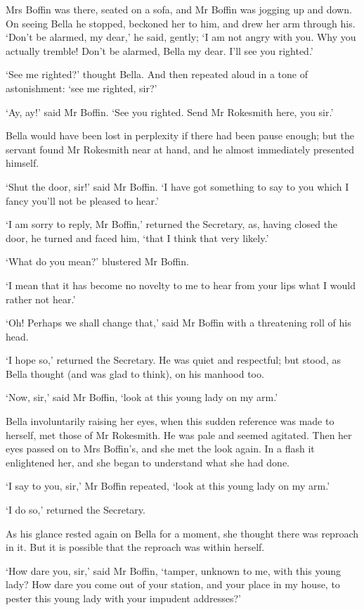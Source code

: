 Mrs Boffin was there, seated on a sofa, and Mr Boffin was jogging up and
down. On seeing Bella he stopped, beckoned her to him, and drew her arm
through his. ‘Don’t be alarmed, my dear,’ he said, gently; ‘I am not
angry with you. Why you actually tremble! Don’t be alarmed, Bella my
dear. I’ll see you righted.’

‘See me righted?’ thought Bella. And then repeated aloud in a tone of
astonishment: ‘see me righted, sir?’

‘Ay, ay!’ said Mr Boffin. ‘See you righted. Send Mr Rokesmith here, you
sir.’

Bella would have been lost in perplexity if there had been pause
enough; but the servant found Mr Rokesmith near at hand, and he almost
immediately presented himself.

‘Shut the door, sir!’ said Mr Boffin. ‘I have got something to say to
you which I fancy you’ll not be pleased to hear.’

‘I am sorry to reply, Mr Boffin,’ returned the Secretary, as, having
closed the door, he turned and faced him, ‘that I think that very
likely.’

‘What do you mean?’ blustered Mr Boffin.

‘I mean that it has become no novelty to me to hear from your lips what
I would rather not hear.’

‘Oh! Perhaps we shall change that,’ said Mr Boffin with a threatening
roll of his head.

‘I hope so,’ returned the Secretary. He was quiet and respectful; but
stood, as Bella thought (and was glad to think), on his manhood too.

‘Now, sir,’ said Mr Boffin, ‘look at this young lady on my arm.’

Bella involuntarily raising her eyes, when this sudden reference was
made to herself, met those of Mr Rokesmith. He was pale and seemed
agitated. Then her eyes passed on to Mrs Boffin’s, and she met the look
again. In a flash it enlightened her, and she began to understand what
she had done.

‘I say to you, sir,’ Mr Boffin repeated, ‘look at this young lady on my
arm.’

‘I do so,’ returned the Secretary.

As his glance rested again on Bella for a moment, she thought there was
reproach in it. But it is possible that the reproach was within herself.

‘How dare you, sir,’ said Mr Boffin, ‘tamper, unknown to me, with this
young lady? How dare you come out of your station, and your place in my
house, to pester this young lady with your impudent addresses?’

